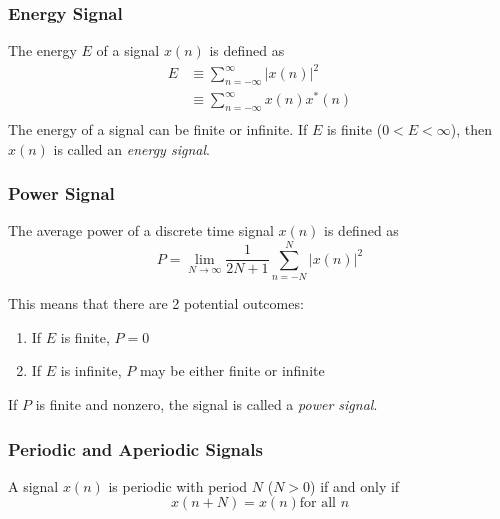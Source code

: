 \subsubsection{Energy Signal}\label{subsubsec:Energy Signal}
\begin{definition}\label{def:Energy Signal}
  The energy $E$ of a signal $x(n)$ is defined as
  \begin{equation}\label{eq:Energy Signal}
    \begin{aligned}
      E &\equiv \sum_{n=-\infty}^{\infty} \lvert x(n) \rvert^{2} \\
      &\equiv \sum_{n=-\infty}^{\infty} x(n) x^{*}(n) \\
    \end{aligned}
  \end{equation}
  The energy of a signal can be finite or infinite. If $E$ is finite ($0 < E < \infty$), then $x(n)$ is called an \emph{energy signal}.
\end{definition}

\subsubsection{Power Signal}\label{subsubsec:Power Signal}
\begin{definition}\label{def:Power Signal}
  The average power of a discrete time signal $x(n)$ is defined as
  \begin{equation}\label{eq:Power Signal}
    P = \lim_{N \rightarrow \infty} \frac{1}{2N+1} \sum_{n=-N}^{N} \lvert x(n) \rvert ^{2}
  \end{equation}

  This means that there are 2 potential outcomes:
  \begin{enumerate}[noitemsep]
  \item If $E$ is finite, $P=0$
  \item If $E$ is infinite, $P$ may be either finite or infinite
  \end{enumerate}

  If $P$ is finite and nonzero, the signal is called a \emph{power signal}.
\end{definition}

\subsubsection{Periodic and Aperiodic Signals}\label{subsubsec:Periodic Aperiodic Signals}
A signal $x(n)$ is periodic with period $N$ ($N>0$) if and only if
\begin{equation}\label{eq:Periodic Signal}
  x(n+N) = x(n) \text{for all } n
\end{equation}

